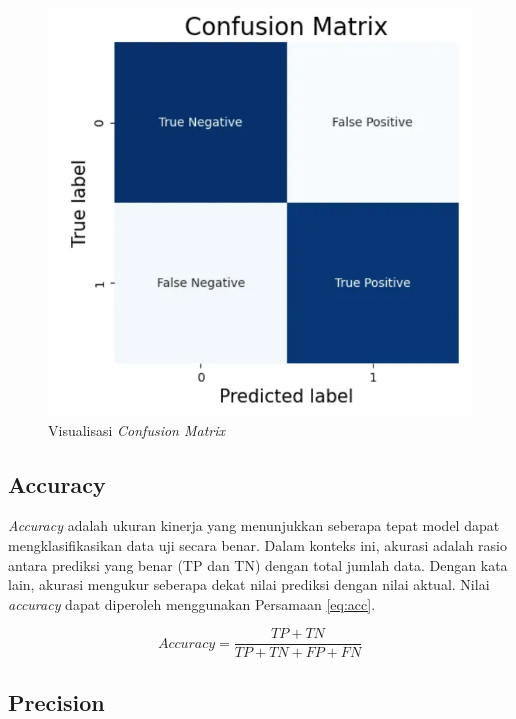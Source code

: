\begin{figure} [ht] \centering
    \includegraphics[scale=0.3]{gambar/bab2/confusion.png}
    \caption{Visualisasi \emph{Confusion Matrix}}
    \label{fig:confusion}
\end{figure}

\subsection{Accuracy}
\label{subsec:acc_klasifikasi}

\emph{Accuracy} adalah ukuran kinerja yang menunjukkan seberapa tepat model dapat mengklasifikasikan data uji secara benar. Dalam konteks ini, akurasi adalah rasio antara prediksi yang benar (TP dan TN) dengan total jumlah data. Dengan kata lain, akurasi mengukur seberapa dekat nilai prediksi dengan nilai aktual. Nilai \emph{accuracy} dapat diperoleh menggunakan Persamaan \ref{eq:acc}. 

\begin{equation}
  \label{eq:acc}
  Accuracy=\frac{TP+TN}{TP+TN+FP+FN}
\end{equation}

\subsection{Precision}
\label{subsec:prec_klasifikasi}

